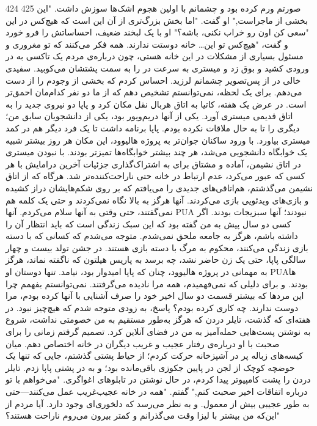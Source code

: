 424 425  
صورتم ورم کرده بود و چشمانم با اولین هجوم اشک‌ها سوزش داشت. "این بخشی از ماجراست," او گفت. "اما بخش بزرگ‌تری از آن این است که هیچ‌کس در این  
"سعی کن اون رو خراب نکنی، باشه؟" او با یک لبخند ضعیف، احساساتش را فرو خورد و گفت، "هیچ‌کس تو این… خانه دوستت ندارند. همه فکر می‌کنند که تو مغروری و مسئول بسیاری از مشکلات در این خانه هستی، چون درباره‌ی مردم  
یک تاکسی به در ورودی کشید و بوق زد و میستری به سرعت در را به سمت پشتشان می‌کوبید. سفیدی خالی در از پس‌تصویر چشمانم لرزید. احساس کردم که بخشی از وجودم را از دست می‌دهم. برای یک لحظه، نمی‌توانستم تشخیص دهم که از ما دو نفر کدام‌مان احمق‌تر است.  
در عرض یک هفته، کاتیا به اتاق هربال نقل مکان کرد و پاپا دو نیروی جدید را به اتاق قدیمی میستری آورد. یکی از آنها دریم‌ویور بود، یکی از دانشجویان سابق من؛ دیگری را تا به حال ملاقات نکرده بودم. پاپا برنامه داشت تا یک فرد دیگر هم در کمد میستری بیاورد. با ورود ساکنان جوان‌تر به پروژه هالیوود، این مکان هر روز بیشتر شبیه یک خوابگاه دانشجویی می‌شد، هر چند بیشتر خوابگاه‌ها تمیزتر بودند.  
با نبودن میستری در اتاق نشیمن، آماده و مشتاق برای به اشتراک‌گذاری جزئیات آخرین درامایش با هر کسی که عبور می‌کرد، عدم ارتباط در خانه حتی ناراحت‌کننده‌تر شد. هرگاه که از اتاق نشیمن می‌گذشتم، هم‌اتاقی‌های جدیدی را می‌یافتم که بر روی شکم‌هایشان دراز کشیده و بازی‌های ویدئویی بازی می‌کردند. آنها هرگز به بالا نگاه نمی‌کردند و حتی یک کلمه هم نمی‌گفتند، حتی وقتی به آنها سلام می‌کردم. آنها PUA نبودند؛ آنها سبزیجات بودند. اگر کسی دو سال پیش به من گفته بود که این سبک زندگی است که باید انتظار آن را داشته باشم، هرگز به جامعه ملحق نمی‌شدم. متوجه می‌شدم که کسانی که با دسته بازی زندگی می‌کنند، محکوم به مرگ با دسته بازی هستند.  
در جشن تولد بیست و چهار سالگی پاپا، حتی یک زن حاضر نشد، چه برسد به پاریس هیلتون که ناگفته نماند، هرگز به مهمانی در پروژه هالیوود، چنان که پاپا امیدوار بود، نیامد. تنها دوستان او PUA‌ها بودند. و برای دلیلی که نمی‌فهمیدم، همه مرا نادیده می‌گرفتند. نمی‌توانستم بفهمم چرا این مردها که بیشتر قسمت دو سال اخیر خود را صرف آشنایی با آنها کرده بودم، مرا دوست ندارند. چه کاری کرده بودم؟  
پاسخ، به زودی متوجه شدم که هیچ‌چیز نبود.  
در هفته‌ای که گذشت، تایلر دردن که هرگز به‌طور مستقیم به من خصومتی نداشت، شروع به نوشتن پست‌هایی حمله‌آمیز به من در فضای آنلاین کرد. تصمیم گرفتم زمانی را برای صحبت با او درباره‌ی رفتار عجیب و غریب دیگران در خانه اختصاص دهم. میان کیسه‌های زباله پر در آشپزخانه حرکت کردم؛ از حیاط پشتی گذشتم، جایی که تنها یک حوضچه کوچک از لجن در پایین جکوزی باقی‌مانده بود؛ و به در پشتی پاپا زدم.  
تایلر دردن را پشت کامپیوتر پیدا کردم، در حال نوشتن در تابلوهای اغواگری.  
"می‌خواهم با تو درباره اتفاقات اخیر صحبت کنم," گفتم. "همه در خانه عجیب‌غریب عمل می‌کنند—حتی به طور عجیبی بیش از معمول. و به نظر می‌رسد که دلخوری‌ای وجود دارد. آیا مردم از این‌که من بیشتر با لیزا وقت می‌گذرانم و کمتر بیرون می‌روم ناراحت هستند؟"